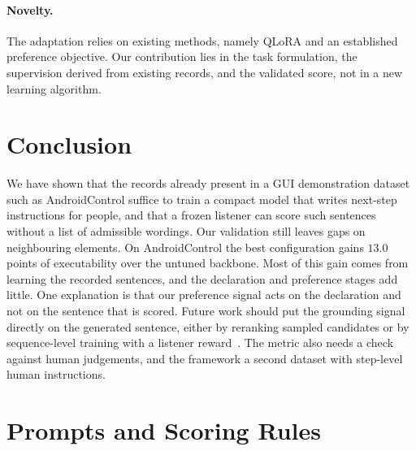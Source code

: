 \documentclass[runningheads,a4paper]{llncs}
\begin{document}
\paragraph{Novelty.}
The adaptation relies on existing methods, namely QLoRA and an established preference objective. Our contribution lies in the task formulation, the supervision derived from existing records, and the validated score, not in a new learning algorithm.

\section{Conclusion}
\label{sec:conclusion}

We have shown that the records already present in a GUI demonstration dataset such as AndroidControl suffice to train a compact model that writes next-step instructions for people, and that a frozen listener can score such sentences without a list of admissible wordings. Our validation still leaves gaps on neighbouring elements. On AndroidControl the best configuration gains $13.0$ points of executability over the untuned backbone. Most of this gain comes from learning the recorded sentences, and the declaration and preference stages add little. One explanation is that our preference signal acts on the declaration
and not on the sentence that is scored. Future work should put the grounding signal directly on the generated sentence, either by reranking sampled candidates or by sequence-level training with a listener reward~\cite{scst,luodisc}. The metric also needs a check against human judgements, and the framework a second dataset with step-level human instructions.

\appendix
\section{Prompts and Scoring Rules}
\label{app:prompts}
\end{document}
